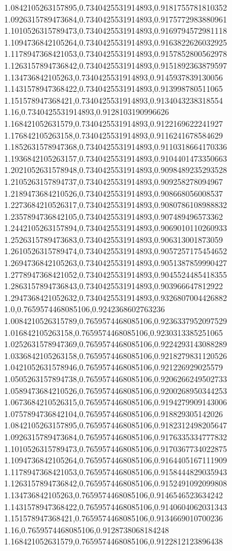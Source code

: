 1.0842105263157895,0.7340425531914893,0.9181755781810352
1.0926315789473684,0.7340425531914893,0.9175772983880961
1.1010526315789473,0.7340425531914893,0.9169794572981118
1.1094736842105264,0.7340425531914893,0.9163822626032925
1.1178947368421053,0.7340425531914893,0.9157852800562978
1.1263157894736842,0.7340425531914893,0.9151892363879597
1.134736842105263,0.7340425531914893,0.9145937839130056
1.1431578947368422,0.7340425531914893,0.913998780511065
1.151578947368421,0.7340425531914893,0.9134043238318554
1.16,0.7340425531914893,0.9128103190996626
1.168421052631579,0.7340425531914893,0.9122169622241927
1.176842105263158,0.7340425531914893,0.9116241678584629
1.1852631578947368,0.7340425531914893,0.9110318664170336
1.1936842105263157,0.7340425531914893,0.9104401473350663
1.2021052631578948,0.7340425531914893,0.9098489235293528
1.2105263157894737,0.7340425531914893,0.909258278094967
1.2189473684210526,0.7340425531914893,0.908668056008537
1.2273684210526317,0.7340425531914893,0.9080786108988832
1.2357894736842105,0.7340425531914893,0.907489496573362
1.2442105263157894,0.7340425531914893,0.9069010110260933
1.2526315789473683,0.7340425531914893,0.906313001873059
1.2610526315789474,0.7340425531914893,0.9057257175454652
1.2694736842105263,0.7340425531914893,0.9051387859990427
1.2778947368421052,0.7340425531914893,0.9045524485418355
1.2863157894736843,0.7340425531914893,0.903966647812922
1.2947368421052632,0.7340425531914893,0.9326807004426882
1.0,0.7659574468085106,0.9242368602763236
1.0084210526315789,0.7659574468085106,0.9236337952097529
1.016842105263158,0.7659574468085106,0.9230313385251065
1.0252631578947369,0.7659574468085106,0.9224293143088289
1.0336842105263158,0.7659574468085106,0.9218279831120526
1.0421052631578946,0.7659574468085106,0.921226929025579
1.0505263157894738,0.7659574468085106,0.9206266249502733
1.0589473684210526,0.7659574468085106,0.9200268950344253
1.0673684210526315,0.7659574468085106,0.9194279909143006
1.0757894736842104,0.7659574468085106,0.918829305142026
1.0842105263157895,0.7659574468085106,0.9182312498205647
1.0926315789473684,0.7659574468085106,0.9176335334777832
1.1010526315789473,0.7659574468085106,0.9170367734022875
1.1094736842105264,0.7659574468085106,0.9164405167111909
1.1178947368421053,0.7659574468085106,0.9158444829035943
1.1263157894736842,0.7659574468085106,0.9152491092099808
1.134736842105263,0.7659574468085106,0.9146546523634242
1.1431578947368422,0.7659574468085106,0.9140604062031343
1.151578947368421,0.7659574468085106,0.9134669010700236
1.16,0.7659574468085106,0.9128738068184248
1.168421052631579,0.7659574468085106,0.9122812123896438
